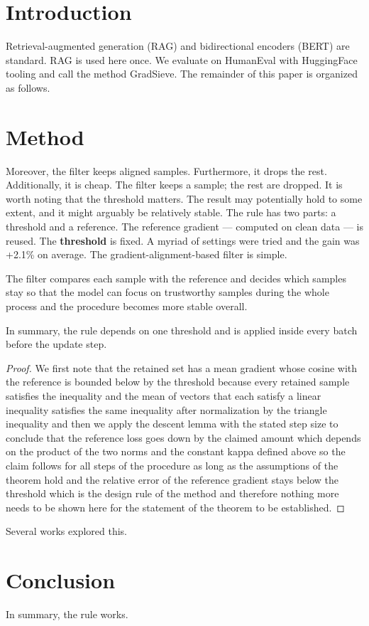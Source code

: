 \documentclass{article}
\begin{document}
\begin{abstract}
Noisy supervision makes a fine-tuned model memorize wrong labels.

We filter samples by gradient alignment and gain 2.1 points.
\end{abstract}

\section{Introduction}
Retrieval-augmented generation (RAG) and bidirectional encoders (BERT) are standard. RAG is used here once.
We evaluate on HumanEval with HuggingFace tooling and call the method GradSieve.
The remainder of this paper is organized as follows.

\section{Method}
Moreover, the filter keeps aligned samples. Furthermore, it drops the rest. Additionally, it is cheap.
The filter keeps a sample; the rest are dropped.
It is worth noting that the threshold matters.
The result may potentially hold to some extent, and it might arguably be relatively stable.
The rule has two parts: a threshold and a reference.
The reference gradient --- computed on clean data --- is reused.
The \textbf{threshold} is fixed.
A myriad of settings were tried and the gain was +2.1\% on average.
The gradient-alignment-based filter is simple.

The filter compares each sample with the reference and decides which samples stay so that the model
can focus on trustworthy samples during the whole process and the procedure becomes more stable overall.

In summary, the rule depends on one threshold and is applied inside every batch before the update step.

\begin{proof}
We first note that the retained set has a mean gradient whose cosine with the reference is bounded below
by the threshold because every retained sample satisfies the inequality and the mean of vectors that each
satisfy a linear inequality satisfies the same inequality after normalization by the triangle inequality
and then we apply the descent lemma with the stated step size to conclude that the reference loss goes down
by the claimed amount which depends on the product of the two norms and the constant kappa defined above
so the claim follows for all steps of the procedure as long as the assumptions of the theorem hold and the
relative error of the reference gradient stays below the threshold which is the design rule of the method
and therefore nothing more needs to be shown here for the statement of the theorem to be established.
\end{proof}
Several works \cite{a,b,c,d,e} explored this.

\section{Conclusion}
In summary, the rule works.
\end{document}
